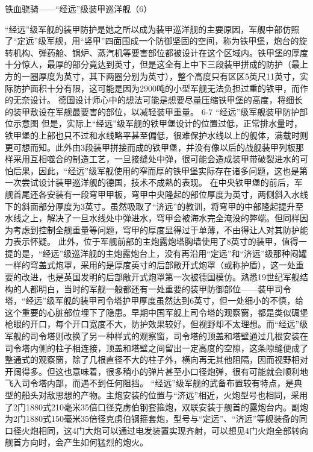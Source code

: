 \documentclass[12pt,UTF8]{ctexbook}
\begin{document}
铁血骁骑——“经远”级装甲巡洋舰（6）

“经远”级军舰的装甲防护是她之所以成为装甲巡洋舰的主要原因，军舰中部仿照了“定远”级军舰，用“竖甲”四面围成一个防御坚固的空间，称为铁甲堡，炮台的旋转机构、弹药舱、锅炉、蒸汽机等要害部位都被设计在这个区域内。铁甲堡的厚度十分惊人，最厚的部分竟达到英寸，但是这全有上中下三段装甲拼成的防护（最上方的一圈厚度为英寸，其下两圈分别为英寸），整个高度只有区区5英尺11英寸，实际防护面积十分有限，这可能是因为2900吨的小型军舰无法负担过重的铁甲，而作的无奈设计。 德国设计师心中的想法可能是想要尽量压缩铁甲堡的高度，将细长的装甲敷设在军舰最要害的部位，以减轻装甲重量。
6-7 “经远”级军舰装甲防护部位示意图
但是，实际上“经远”级军舰的铁甲堡设计的位置过低，正常排水量时，铁甲堡的上部也只不过和水线略平甚至偏低，很难保护水线以上的舰体，满载时则更可想而知。此外由3段装甲拼接而成的铁甲堡，并没有像以后的战舰装甲列板那样采用互相噬合的制造工艺，一旦接缝处中弹，很可能会造成装甲带破裂进水的可怕后果，因此，“经远”级军舰使用的窄而厚的铁甲堡实际存在诸多问题，这也是第一次尝试设计装甲巡洋舰的德国，技术不成熟的表现。
在中央铁甲堡的前后，军舰首尾还各安装有一段穹甲甲板，穹甲中央隆起的部位厚度为英寸，两侧斜入水线下的斜面部分厚度为3英寸。虽然吸取了“济远”的教训，将穹甲的中部隆起提升至水线之上，解决了一旦水线处中弹进水，穹甲会被海水完全淹没的弊端。但同样因为考虑到控制全舰重量等问题，穹甲的厚度显得过于单薄，不由得让人对其防护能力表示怀疑。
此外，位于军舰前部的主炮露炮塔胸墙使用了8英寸的装甲，值得一提的是，“经远”级巡洋舰的主炮露炮台上，没有再沿用“定远”和“济远”级那种闷罐一样的穹盖式炮罩，采用的是厚度英寸的后部敞开式炮罩（或称护盾），这一处重要的改进，也是英国发明的后部敞开式炮罩第一次被德国模仿。熟悉19世纪军舰结构的人都明白，当时的军舰一般都还有一处重要的装甲防御部位——装甲司令塔，“经远”级军舰的装甲司令塔护甲厚度虽然达到6英寸，但一处细小的不慎，给这个重要的心脏部位埋下了隐患。早期中国军舰上司令塔的观察窗，都是类似碉堡枪眼的开口，每个开口宽度不大，防护效果较好，但视野却不太理想。而“经远”级军舰的司令塔则改换了另一种样式的观察窗，司令塔的顶盖和塔壁通过几根安装在司令塔内侧的柱子相连接，顶盖和塔壁之间留出一定高度的空隙，这条隙缝便成了整通式的观察窗，除了几根直径不大的柱子外，横向再无其他阻隔，因而视野相对开阔得多。但这也意味着，很多稍小的弹片甚至小口径炮弹，很有可能就会顺利地飞入司令塔内部，而遇不到任何阻挡。
“经远”级军舰的武备布置较有特点，是典型的船头对敌思想的产物。主炮安装的位置与“济远”相近，火炮型号也相同，采用了2门1880式210毫米35倍口径克虏伯钢套箍炮，双联安装于舰首的露炮台内。副炮为2门1880式150毫米35倍径克虏伯钢箍套炮，型号与“定远”、“济远”等舰装备的同口径火炮相同，这4门大炮可以通过电发装置实现齐射，可以想见4门火炮全部转向舰首方向时，会产生如何猛烈的炮火。
\end{document}
